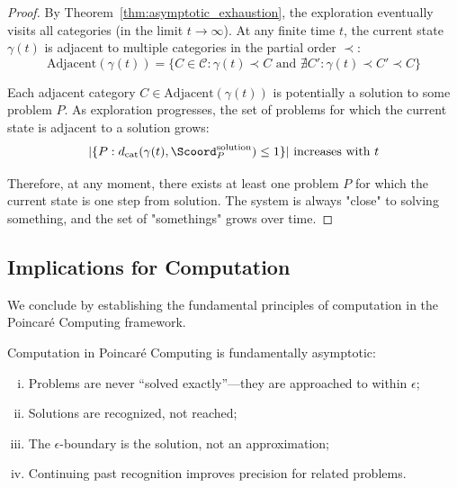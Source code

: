 \begin{proof}
By Theorem~\ref{thm:asymptotic_exhaustion}, the exploration eventually visits all categories (in the limit $t \to \infty$). At any finite time $t$, the current state $\gamma(t)$ is adjacent to multiple categories in the partial order $\prec$:
\begin{equation}
\text{Adjacent}(\gamma(t)) = \{C \in \mathcal{C} : \gamma(t) \prec C \text{ and } \nexists C': \gamma(t) \prec C' \prec C\}
\end{equation}

Each adjacent category $C \in \text{Adjacent}(\gamma(t))$ is potentially a solution to some problem $P$. As exploration progresses, the set of problems for which the current state is adjacent to a solution grows:
\begin{equation}
|\{P : d_{\text{cat}}(\gamma(t), \Scoord_P^{\text{solution}}) \leq 1\}| \text{ increases with } t
\end{equation}

Therefore, at any moment, there exists at least one problem $P$ for which the current state is one step from solution. The system is always "close" to solving something, and the set of "somethings" grows over time.
\end{proof}

\subsection{Implications for Computation}

We conclude by establishing the fundamental principles of computation in the Poincaré Computing framework.

\begin{theorem}
\label{thm:asymptotic_computation}
Computation in Poincaré Computing is fundamentally asymptotic:
\begin{enumerate}[(i)]
    \item Problems are never ``solved exactly''---they are approached to within $\epsilon$;
    \item Solutions are recognized, not reached;
    \item The $\epsilon$-boundary is the solution, not an approximation;
    \item Continuing past recognition improves precision for related problems.
\end{enumerate}
\end{theorem}

